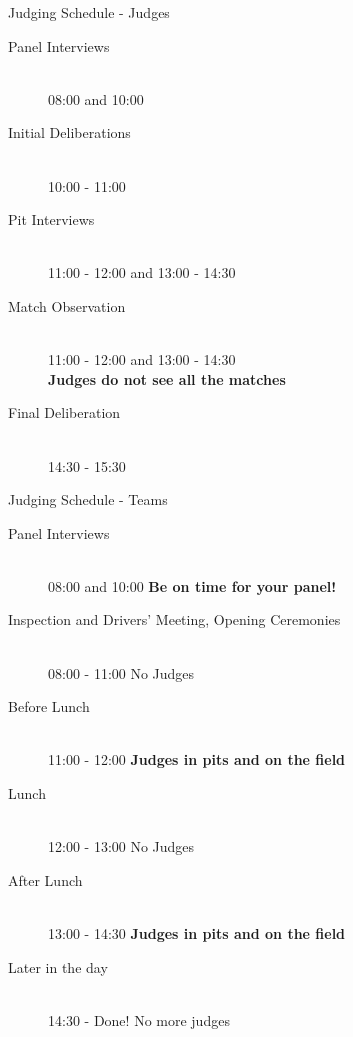 \documentclass{beamer}
\begin{document}
  \begin{frame}{Judging Schedule - Judges}
    \begin{description}
    \item[Panel Interviews] \hfill \\ 08:00 and 10:00
    \item[Initial Deliberations] \hfill \\ 10:00 - 11:00
    \item[Pit Interviews] \hfill  \\ 11:00 - 12:00 and 13:00 - 14:30
    \item[Match Observation] \hfill \\ 11:00 - 12:00 and 13:00 - 14:30 \\
      \textbf{Judges do not see all the matches}
    \item[Final Deliberation] \hfill \\ 14:30 - 15:30
    \end{description}
  \end{frame}

  \begin{frame}{Judging Schedule - Teams}
    \begin{description}
    \item[Panel Interviews] \hfill
      \\ 08:00 and 10:00 \textbf{Be on time for your panel!}
    \item[Inspection and Drivers' Meeting, Opening Ceremonies] \hfill \\
      08:00 - 11:00 No Judges
    \item[Before Lunch] \hfill \\
      11:00 - 12:00 \textbf{Judges in pits and on the field}
    \item[Lunch] \hfill \\
      12:00 - 13:00 No Judges
    \item[After Lunch] \hfill \\
      13:00 - 14:30 \textbf{Judges in pits and on the field}
    \item[Later in the day] \hfill \\
      14:30 - Done! No more judges
    \end{description}
  \end{frame}
\end{document}
